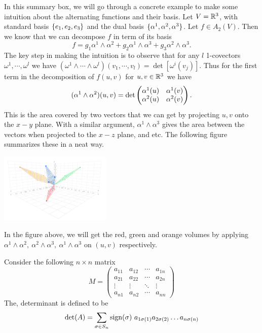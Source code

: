 \begin{summary}
	In this summary box, we will go through a concrete example to make some intuition about the alternating functions and their basis. Let $ V = \mathbb{R}^3 $, with standard basis $ \{e_1,e_2,e_3\} $ and the dual basis $ \{\alpha^1,\alpha^2,\alpha^3\} $. Let $ f \in A_2(V) $. Then we know that we can decompose $ f $ in term of its basis
	\[ f = g_1 \alpha^1 \wedge \alpha^2 + g_2 \alpha^1 \wedge \alpha^3 + g_3 \alpha^2 \wedge \alpha^3. \]
	The key step in making the intuition is to observe that for any $ l $ 1-covectors $ \omega^1,\cdots,\omega^l $ we have $ (\omega^1\wedge \cdots \wedge \omega^l)(v_1,\cdots,v_l)  = \det\left[ \omega^i(v_j) \right]$. Thus for the first term in the decomposition of $ f(u,v) $ for $ u,v \in \mathbb{R}^3 $ we have
	\[ (\alpha^1 \wedge \alpha^2)(u,v) = 
	\det \begin{pmatrix} \alpha^1(u) & \alpha^1(v) \\ \alpha^2(u) & \alpha^2(v) \end{pmatrix}.
	 \]
	 This is the area covered by two vectors that we can get by projecting $ u,v $ onto the $ x-y $ plane. With a similar argument, $ \alpha^1\wedge\alpha^3 $ gives the area between the vectors when projected to the $ x-z $ plane, and etc. The following figure summarizes these in a neat way.
	 \begin{center}
	 		 \includegraphics[width=0.4\textwidth]{Images/intuitiveWedge.png}
	 \end{center}
	 \FloatBarrier
	 In the figure above, we will get the red, green and orange volumes by applying $ \alpha^1 \wedge \alpha^2,\ \alpha^2\wedge \alpha^3,\ \alpha^1\wedge\alpha^3 $ on $ (u,v) $ respectively.


\end{summary}

\begin{summary}
	Consider the following $ n\times n $ matrix
	\[ 
	M = \begin{pmatrix}
		a_{11} & a_{12} & \cdots & a_{1n} \\
		a_{21} & a_{22} & \cdots & a_{2n} \\
		\vdots & \vdots & \ddots & \vdots \\
		a_{n1} & a_{n2} & \cdots & a_{nn}
	\end{pmatrix}
	 \]
	The, determinant is defined to be
	\[ \det(A) = \sum_{\sigma \in S_n} \operatorname{sign}(\sigma)\ a_{1\sigma(1)}a_{2\sigma(2)}\dots a_{n\sigma(n)} \]
\end{summary}

